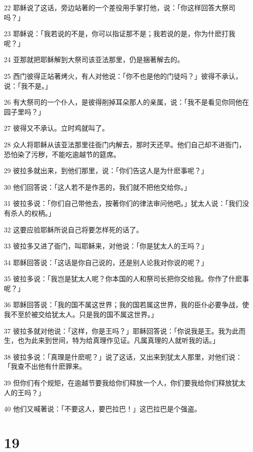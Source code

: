 \par 22 耶稣说了这话，旁边站著的一个差役用手掌打他，说：「你这样回答大祭司吗？」
\par 23 耶稣说：「我若说的不是，你可以指证那不是；我若说的是，你为什麽打我呢？」
\par 24 亚那就把耶稣解到大祭司该亚法那里，仍是捆著解去的。
\par 25 西门彼得正站著烤火，有人对他说：「你不也是他的门徒吗？」彼得不承认，说：「我不是。」
\par 26 有大祭司的一个仆人，是彼得削掉耳朵那人的亲属，说：「我不是看见你同他在园子里吗？」
\par 27 彼得又不承认。立时鸡就叫了。
\par 28 众人将耶稣从该亚法那里往衙门内解去，那时天还早。他们自己却不进衙门，恐怕染了污秽，不能吃逾越节的筵席。
\par 29 彼拉多就出来，到他们那里，说：「你们告这人是为什麽事呢？」
\par 30 他们回答说：「这人若不是作恶的，我们就不把他交给你。」
\par 31 彼拉多说：「你们自己带他去，按著你们的律法审问他吧。」犹太人说：「我们没有杀人的权柄。」
\par 32 这要应验耶稣所说自己将要怎样死的话了。
\par 33 彼拉多又进了衙门，叫耶稣来，对他说：「你是犹太人的王吗？」
\par 34 耶稣回答说：「这话是你自己说的，还是别人论我对你说的呢？」
\par 35 彼拉多说：「我岂是犹太人呢？你本国的人和祭司长把你交给我。你作了什麽事呢？」
\par 36 耶稣回答说：「我的国不属这世界；我的国若属这世界，我的臣仆必要争战，使我不至於被交给犹太人。只是我的国不属这世界。」
\par 37 彼拉多就对他说：「这样，你是王吗？」耶稣回答说：「你说我是王。我为此而生，也为此来到世间，特为给真理作见证。凡属真理的人就听我的话。」
\par 38 彼拉多说：「真理是什麽呢？」说了这话，又出来到犹太人那里，对他们说：「我查不出他有什麽罪来。
\par 39 但你们有个规矩，在逾越节要我给你们释放一个人，你们要我给你们释放犹太人的王吗？」
\par 40 他们又喊著说：「不要这人，要巴拉巴！」这巴拉巴是个强盗。

\chapter{19}

